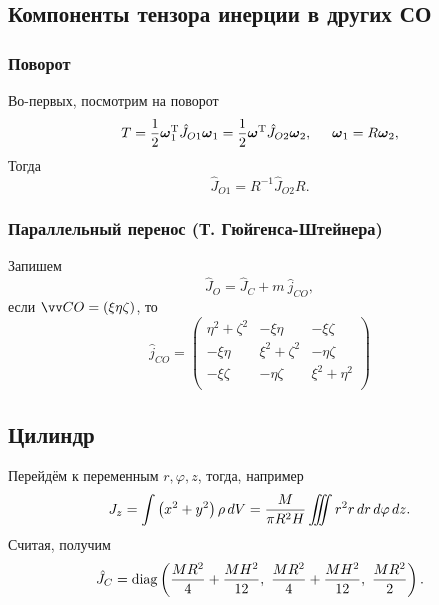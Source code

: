 \subsection{Компоненты тензора инерции в других СО}


\subsubsection{Поворот}


Во-первых, посмотрим на поворот
$$
    T = \frac{1}{2}  \mbox{\boldmath $\omega$}_{1}^{\text{T}} \hat{J}_{O1} \mbox{\boldmath $\omega$}_1 =
    \frac{1}{2} \mbox{\boldmath $\omega$}^{\text{T}} \hat J_{O2} \mbox{\boldmath $\omega$}_2,
    \hspace{0.5cm} 
    \mbox{\boldmath $\omega$}_1 = R \mbox{\boldmath $\omega$}_2,
$$
Тогда
\begin{equation}
    \boxed{
        \hat J_{O1} = R^{-1} \hat J_{O2} R
    }.
\end{equation}



\subsubsection{Параллельный перенос (Т. Гюйгенса-Штейнера)}

Запишем
\begin{equation}
    \hat J_O = \hat J_C + m \ \hat j_{CO},
\end{equation}
если $\vv CO = (\xi \eta \zeta)$, то
\begin{equation}
    \hat j_{CO} =
    \begin{pmatrix}
        \eta^2 + \zeta^2 & - \xi \eta & - \xi \zeta \\
        - \xi \eta & \xi^2 + \zeta^2 & - \eta \zeta \\
        - \xi \zeta & - \eta \zeta & \xi^2 + \eta^2 \\
    \end{pmatrix}
\end{equation}

\subsection{Цилиндр}

Перейдём к переменным $r, \varphi, z$, тогда, например
\begin{equation}
    J_z=
    \int
    \left(x^2 + y^2\right) \rho \, d V=
    \frac{M}{\pi R^2 H} 
    \iiint r^2 r \, d r \, d \varphi \, d z.
\end{equation}
Считая, получим
\begin{equation}
    \hat{J}_C = \mathop{\mathrm{diag}}\nolimits\left(
        \frac{MR^2}{4} +\frac{MH^2}{12}, \
        \frac{MR^2}{4} + \frac{MH^2}{12}, \
        \frac{MR^2}{2}  
    \right).
\end{equation}

